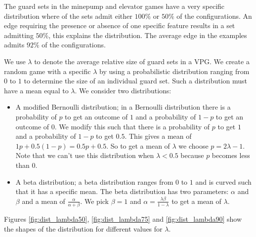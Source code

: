 The guard sets in the minepump and elevator games have a very specific distribution where of the sets admit either $100\%$ or $50\%$ of the configurations. An edge requiring the presence or absence of one specific feature results in a set admitting $50\%$, this explains the distribution. The average edge in the examples admits $92\%$ of the configurations. 

We use $\lambda$ to denote the average relative size of guard sets in a VPG. We create a random game with a specific $\lambda$ by using a probabilistic distribution ranging from $0$ to $1$ to determine the size of an individual guard set. Such a distribution must have a mean equal to $\lambda$. We consider two distributions:
\begin{itemize}
	\item A modified Bernoulli distribution; in a Bernoulli distribution there is a probability of $p$ to get an outcome of $1$ and a probability of $1-p$ to get an outcome of $0$. We modify this such that there is a probability of $p$ to get $1$ and a probability of $1-p$ to get $0.5$. This gives a mean of $1p + 0.5(1-p) = 0.5p + 0.5$. So to get a mean of $\lambda$ we choose $p = 2\lambda - 1$. Note that we can't use this distribution when $\lambda < 0.5$ because $p$ becomes less than $0$.
	\item A beta distribution; a beta distribution ranges from $0$ to $1$ and is curved such that it has a specific mean. The beta distribution has two parameters: $\alpha$ and $\beta$ and a mean of $\frac{\alpha}{\alpha+\beta}$. We pick $\beta=1$ and $\alpha = \frac{\lambda\beta}{1-\lambda}$ to get a mean of $\lambda$.
\end{itemize}
Figures \ref{fig:dist_lambda50}, \ref{fig:dist_lambda75} and \ref{fig:dist_lambda90} show the shapes of the distribution for different values for $\lambda$.

